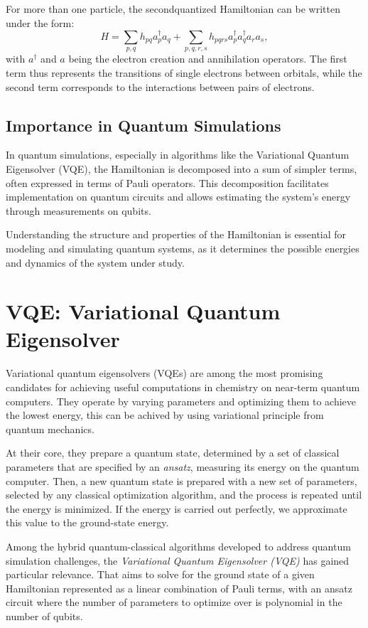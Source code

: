 For more than one particle, the second\-quantized Hamiltonian can be written under the form:
\[
H =
\sum_{p,q} h_{pq} a_p^\dagger a_q +
\sum_{p,q,r,s} h_{pqrs} a_p^\dagger a_q^\dagger a_r a_s,
\]
with \(a^\dagger\) and \(a\) being the electron creation and annihilation operators. The first term thus represents the transitions of single electrons between orbitals, while the second term corresponds to the interactions between pairs of electrons\cite{SecondQuantization}.

\subsection{Importance in Quantum Simulations}

In quantum simulations, especially in algorithms like the Variational Quantum Eigensolver (VQE), the Hamiltonian is decomposed into a sum of simpler terms, often expressed in terms of Pauli operators. This decomposition facilitates implementation on quantum circuits and allows estimating the system's energy through measurements on qubits.

Understanding the structure and properties of the Hamiltonian is essential for modeling and simulating quantum systems, as it determines the possible energies and dynamics of the system under study.

\section{VQE: Variational Quantum Eigensolver}
\label{sec:vqe}

Variational quantum eigensolvers (VQEs) are among the most promising candidates for achieving useful computations in chemistry on near-term quantum computers. They operate by varying parameters and optimizing them to achieve the lowest energy, this can be achived by using variational principle from quantum mechanics. 

At their core, they prepare a quantum state, determined by a set of classical parameters that are specified by an \textit{ansatz}, measuring its energy on the quantum computer. Then, a new quantum state is prepared with a new set of parameters, selected by any classical optimization algorithm, and the process is repeated until the energy is minimized. If the energy is carried out perfectly, we approximate this value to the ground-state energy. \cite{VQEs}

Among the hybrid quantum-classical algorithms developed to address quantum simulation challenges, the \emph{Variational Quantum Eigensolver (VQE)} has gained particular relevance. That aims to solve for the ground state of a given Hamiltonian represented as a linear combination of Pauli terms, with an ansatz circuit where the number of parameters to optimize over is polynomial in the number of qubits. \cite{ibm_vqe_tutorial}


